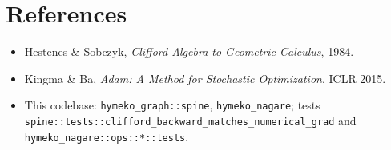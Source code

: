 \documentclass[11pt]{article}
\begin{document}
\section*{References}

\begin{itemize}
  \item Hestenes \& Sobczyk, \emph{Clifford Algebra to Geometric
    Calculus}, 1984.
  \item Kingma \& Ba, \emph{Adam: A Method for Stochastic
    Optimization}, ICLR 2015.
  \item This codebase: \texttt{hymeko\_graph::spine},
    \texttt{hymeko\_nagare}; tests
    \texttt{spine::tests::clifford\_backward\_matches\_numerical\_grad}
    and \texttt{hymeko\_nagare::ops::*::tests}.
\end{itemize}
\end{document}

